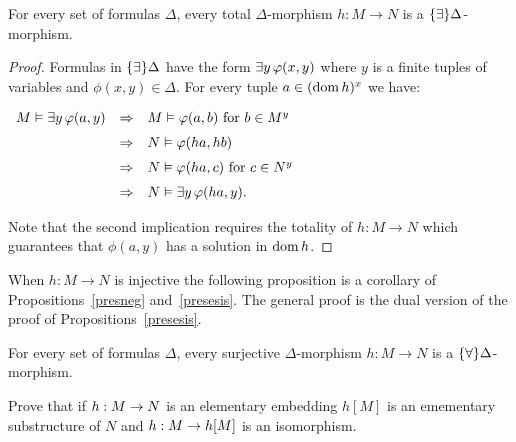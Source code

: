 \begin{proposition}\label{presesis}
For every set of formulas $\Delta$, every total $\Delta$-morphism $h:M\to N$ is a $\{\exists\}\Delta$-mor\-phism.
\end{proposition}
\begin{proof}
Formulas in $\{\exists\}\Delta$ have the form $\exists y\,\varphi(x,y)$ where $y$ is a finite tuples of variables and  $\phi(x,y)\in\Delta$.
For every tuple $a\in(\mathop{\rm dom} h)^{x}$ we have:

\hfil
$\begin{array}{rcl}
M\models\E y\,\phi(a,y) %
&\IMP& M\models\phi(a,b)\textrm{ for } b\in M^{y}  \\[2mm]
&\IMP& N\models\phi(ha,hb) \\[2mm]
&\IMP& N\models\phi(ha,c)\textrm{ for } c\in N^{y}  \\[2mm]
&\IMP& N\models\E y\,\phi(ha,y).\\
\end{array}$

Note that the second implication requires the totality of  $h:M\to N$ which guarantees that $\phi(a,y)$ has a solution in $\mathop{\rm dom} h$.
\end{proof}

When $h:M\to N$ is injective the following proposition is a corollary of Propositions~\ref{presneg} and~\ref{presesis}.
The general proof is the dual version of the proof of Propositions~\ref{presesis}.

\begin{proposition}\label{presuniv}
For every set of formulas $\Delta$, every surjective $\Delta$-morphism $h:M\to N$ is a $\{\forall\}\Delta$-mor\-phism.
\end{proposition}



\begin{exercise}\label{ex_elmap}
Prove that if $h:M\rightarrow N$ is an elementary embedding $h[M]$ is an emementary substructure of $N$ and $h:M\rightarrow h[M]$ is an isomorphism.
\end{exercise}
